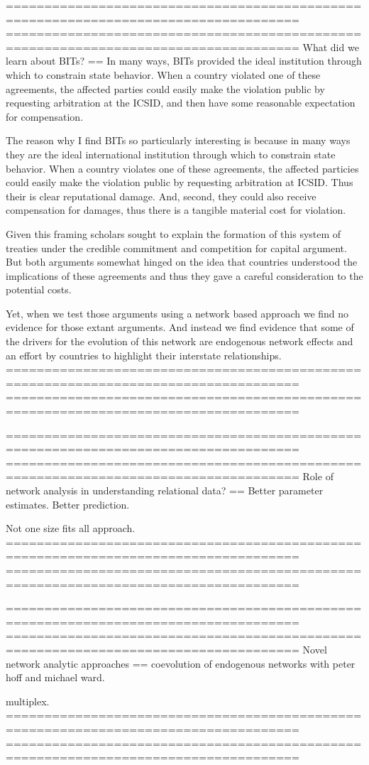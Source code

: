 ====================================================================================
====================================================================================
What did we learn about BITs?
==
In many ways, BITs provided the ideal institution through which to constrain state behavior. When a country violated one of these agreements, the affected parties could easily make the violation public by requesting arbitration at the ICSID, and then have some reasonable expectation for compensation.

The reason why I find BITs so particularly interesting is because in many ways they are the ideal international institution through which to constrain state behavior. When a country violates one of these agreements, the affected particies could easily make the violation public by requesting arbitration at ICSID. Thus their is clear reputational damage. And, second, they could also receive compensation for damages, thus there is a tangible material cost for violation. 

Given this framing scholars sought to explain the formation of this system of treaties under the credible commitment and competition for capital argument. But both arguments somewhat hinged on the idea that countries understood the implications of these agreements and thus they gave a careful consideration to the potential costs. 

Yet, when we test those arguments using a network based approach we find no evidence for those extant arguments. And instead we find evidence that some of the drivers for the evolution of this network are endogenous network effects and an effort by countries to highlight their interstate relationships.
====================================================================================
====================================================================================

====================================================================================
====================================================================================
Role of network analysis in understanding relational data?
==
Better parameter estimates. Better prediction.

Not one size fits all approach. 
====================================================================================
====================================================================================

====================================================================================
====================================================================================
Novel network analytic approaches
==
coevolution of endogenous networks with peter hoff and michael ward.

multiplex.
====================================================================================
====================================================================================